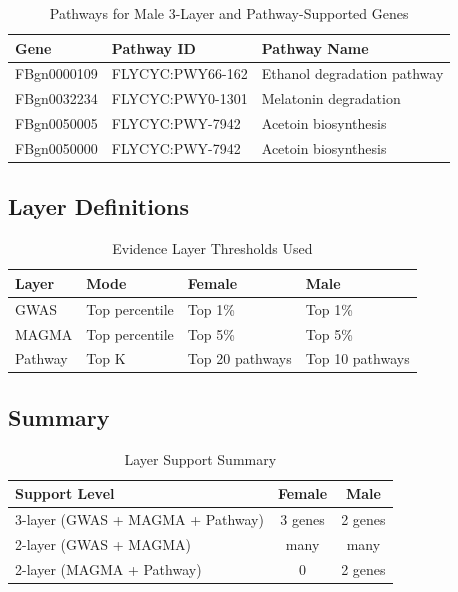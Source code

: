 \documentclass[11pt]{article}
\begin{document}
\begin{table}[h!]
\centering
\caption{Pathways for Male 3-Layer and Pathway-Supported Genes}
\begin{tabular}{lll}
\toprule
\textbf{Gene} & \textbf{Pathway ID} & \textbf{Pathway Name} \\
\midrule
FBgn0000109 & FLYCYC:PWY66-162 & Ethanol degradation pathway \\
FBgn0032234 & FLYCYC:PWY0-1301 & Melatonin degradation \\
FBgn0050005 & FLYCYC:PWY-7942 & Acetoin biosynthesis \\
FBgn0050000 & FLYCYC:PWY-7942 & Acetoin biosynthesis \\
\bottomrule
\end{tabular}
\label{tab:male_pathways}
\end{table}

\vspace{1cm}


\subsection*{Layer Definitions}

\begin{table}[h!]
\centering
\caption{Evidence Layer Thresholds Used}
\begin{tabular}{llll}
\toprule
\textbf{Layer} & \textbf{Mode} & \textbf{Female} & \textbf{Male} \\
\midrule
GWAS & Top percentile & Top 1\% & Top 1\% \\
MAGMA & Top percentile & Top 5\% & Top 5\% \\
Pathway & Top K & Top 20 pathways & Top 10 pathways \\
\bottomrule
\end{tabular}
\label{tab:thresholds}
\end{table}


\subsection*{Summary}

\begin{table}[h!]
\centering
\caption{Layer Support Summary}
\begin{tabular}{lcc}
\toprule
\textbf{Support Level} & \textbf{Female} & \textbf{Male} \\
\midrule
3-layer (GWAS + MAGMA + Pathway) & 3 genes & 2 genes \\
2-layer (GWAS + MAGMA) & many & many \\
2-layer (MAGMA + Pathway) & 0 & 2 genes \\
\bottomrule
\end{tabular}
\label{tab:summary}
\end{table}
\end{document}
